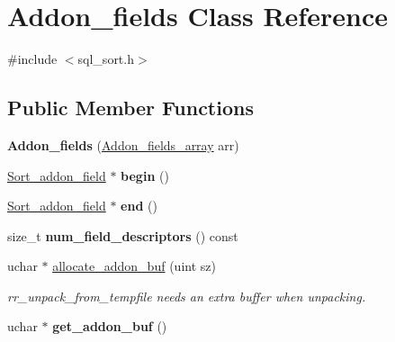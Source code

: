 \hypertarget{classAddon__fields}{}\section{Addon\+\_\+fields Class Reference}
\label{classAddon__fields}


{\ttfamily \#include $<$sql\+\_\+sort.\+h$>$}

\subsection*{Public Member Functions}
\begin{DoxyCompactItemize}
\item 
\mbox{\label{classAddon__fields_ae54c8a62c8125cae46c915afca145bb9}} 
{\bfseries Addon\+\_\+fields} (\mbox{\hyperlink{classBounds__checked__array}{Addon\+\_\+fields\+\_\+array}} arr)
\item 
\mbox{\label{classAddon__fields_a0e750b142aba2f4824eee4e19ef40f0a}} 
\mbox{\hyperlink{structSort__addon__field}{Sort\+\_\+addon\+\_\+field}} $\ast$ {\bfseries begin} ()
\item 
\mbox{\label{classAddon__fields_ac2e893c3c4ce24c8b1a12303615fae86}} 
\mbox{\hyperlink{structSort__addon__field}{Sort\+\_\+addon\+\_\+field}} $\ast$ {\bfseries end} ()
\item 
\mbox{\label{classAddon__fields_ad7977f405e0c1a9add1a19f88a35ff12}} 
size\+\_\+t {\bfseries num\+\_\+field\+\_\+descriptors} () const
\item 
\mbox{\label{classAddon__fields_a3d4df887ce1013f12313f6a689420735}} 
uchar $\ast$ \mbox{\hyperlink{classAddon__fields_a3d4df887ce1013f12313f6a689420735}{allocate\+\_\+addon\+\_\+buf}} (uint sz)
\begin{DoxyCompactList}\small\item\em rr\+\_\+unpack\+\_\+from\+\_\+tempfile needs an extra buffer when unpacking. \end{DoxyCompactList}\item 
\mbox{\label{classAddon__fields_a47012cfc53ab4ae15ded69d7e4103888}} 
uchar $\ast$ {\bfseries get\+\_\+addon\+\_\+buf} ()

\end{DoxyCompactItemize}
